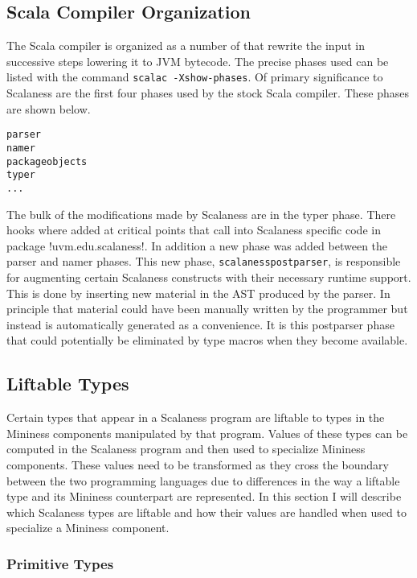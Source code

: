 \subsection{Scala Compiler Organization}
\label{section-scala-compiler-organization}

The Scala compiler is organized as a number of  that rewrite the input in
successive steps lowering it to JVM bytecode. The precise phases used can be listed with the
command \texttt{scalac -Xshow-phases}. Of primary significance to Scalaness are the first four
phases used by the stock Scala compiler. These phases are shown below.

\singlespace
\begin{Verbatim}
parser
namer
packageobjects
typer
...
\end{Verbatim}
\primaryspacing

The bulk of the modifications made by Scalaness are in the typer phase. There hooks where added
at critical points that call into Scalaness specific code in package !uvm.edu.scalaness!. In
addition a new phase was added between the parser and namer phases. This new phase,
\texttt{scalanesspostparser}, is responsible for augmenting certain Scalaness constructs with
their necessary runtime support. This is done by inserting new material in the AST produced by
the parser. In principle that material could have been manually written by the programmer but
instead is automatically generated as a convenience. It is this postparser phase that could
potentially be eliminated by type macros when they become available.

\subsection{Liftable Types}
\label{section-liftable-types}

Certain types that appear in a Scalaness program are liftable to types in the Mininess
components manipulated by that program. Values of these types can be computed in the Scalaness
program and then used to specialize Mininess components. These values need to be transformed as
they cross the boundary between the two programming languages due to differences in the way a
liftable type and its Mininess counterpart are represented. In this section I will describe
which Scalaness types are liftable and how their values are handled when used to specialize a
Mininess component.

\subsubsection{Primitive Types}
\label{section-liftable-primitives}

